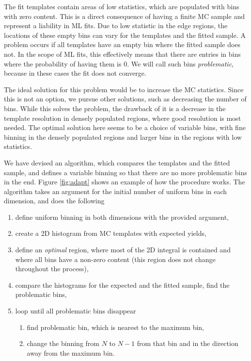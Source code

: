 \documentclass[headings=standardclasses,headings=big,oneside,a4paper,openany,12pt]{scrbook}
\begin{document}
The fit templates contain areas of low statistics, which are populated with bins with zero content. This is a direct consequence of having a finite MC sample and represent a liability in ML fits. Due to low statistic in the edge regions, the locations of these empty bins can vary for the templates and the fitted sample. A problem occurs if all templates have an empty bin where the fitted sample does not. In the scope of ML fits, this effectively means that there are entries in bins where the probability of having them is $0$. We will call such bins \textit{problematic}, because in these cases the fit does not converge.

The ideal solution for this problem would be to increase the MC statistics. Since this is not an option, we pursue other solutions, such as decreasing the number of bins. While this solves the problem, the drawback of it is a decrease in the template resolution in densely populated regions, where good resolution is most needed. The optimal solution here seems to be a choice of variable bins, with fine binning in the densely populated regions and larger bins in the regions with low statistics.

We have devised an algorithm, which compares the templates and the fitted sample, and defines a variable binning so that there are no more problematic bins in the end. Figure \ref{fig:adapt} shows an example of how the procedure works. The algorithm takes an argument for the initial number of uniform bins in each dimension, and does the following
\begin{enumerate}
\item define uniform binning in both dimensions with the provided argument,
\item create a 2D histogram from MC templates with expected yields,
\item define an \textit{optimal} region, where most of the 2D integral is contained and where all bins have a non-zero content (this region does not change throughout the process),
\item compare the histograms for the expected and the fitted sample, find the problematic bins,
\item loop until all problematic bins disappear
	\begin{enumerate}
	\item find problematic bin, which is nearest to the maximum bin,
	\item change the binning from $N$ to $N-1$ from that bin and in the direction away from the maximum bin.
	\end{enumerate}
\end{enumerate}
\end{document}

